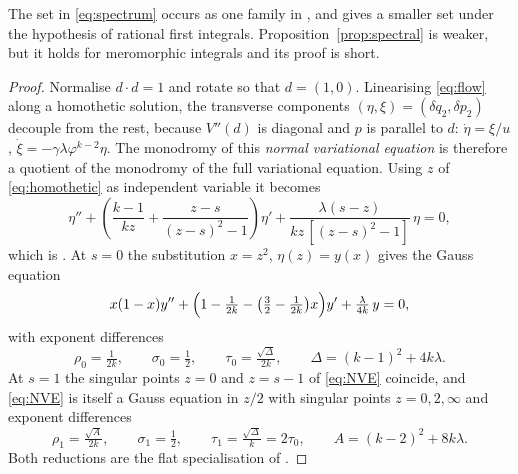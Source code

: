 \documentclass[11pt]{article}
\numberwithin{equation}{section}
\theoremstyle{definition}
\theoremstyle{remark}
\begin{document}
The set in \eqref{eq:spectrum} occurs as one family in \cite[Proposition~2]{PSM23}, and \cite[Theorem~3]{PSM23}
gives a smaller set under the hypothesis of rational first integrals. Proposition~\ref{prop:spectral} is weaker,
but it holds for meromorphic integrals and its proof is short.

\begin{proof}
Normalise $d\cdot d=1$ and rotate so that $d=(1,0)$. Linearising \eqref{eq:flow} along a homothetic solution, the
transverse components $(\eta,\xi)=(\delta q_2,\delta p_2)$ decouple from the rest, because $V''(d)$ is diagonal and
$p$ is parallel to $d$:
$\dot\eta=\xi/u$, $\dot\xi=-\gamma\lambda\varphi^{k-2}\eta$. The monodromy of this \emph{normal variational
equation} is therefore a quotient of the monodromy of the full variational equation. Using $z$ of
\eqref{eq:homothetic} as independent variable it becomes
\begin{equation}\label{eq:NVE}
\eta''+\left(\frac{k-1}{kz}+\frac{z-s}{(z-s)^2-1}\right)\eta'
+\frac{\lambda(s-z)}{kz\,[(z-s)^2-1]}\,\eta=0,
\end{equation}
which is \cite[eq.~(30)]{PSM23}. At $s=0$ the substitution $x=z^2$, $\eta(z)=y(x)$ gives the Gauss equation
\begin{equation}\label{eq:G5}
x(1-x)y''+\Bigl(1-\tfrac1{2k}-\bigl(\tfrac32-\tfrac1{2k}\bigr)x\Bigr)y'+\tfrac{\lambda}{4k}\,y=0,
\end{equation}
with exponent differences
\begin{equation}\label{eq:exp0}
\rho_0=\tfrac1{2k},\qquad\sigma_0=\tfrac12,\qquad\tau_0=\tfrac{\sqrt\Delta}{2k},\qquad\Delta=(k-1)^2+4k\lambda .
\end{equation}
At $s=1$ the singular points $z=0$ and $z=s-1$ of \eqref{eq:NVE} coincide, and \eqref{eq:NVE} is itself a Gauss equation
in $z/2$ with singular points $z=0,2,\infty$ and exponent differences
\begin{equation}\label{eq:exp1}
\rho_1=\tfrac{\sqrt A}{2k},\qquad\sigma_1=\tfrac12,\qquad\tau_1=\tfrac{\sqrt\Delta}{k}=2\tau_0,\qquad
A=(k-2)^2+8k\lambda .
\end{equation}
Both reductions are the flat specialisation of \cite[Sec.~3.1, eqs.~(31)--(34)]{SP25}.


\end{proof}
\end{document}
